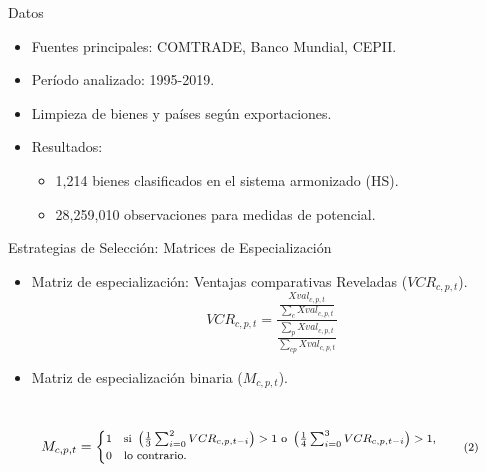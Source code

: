 \documentclass{beamer}
\begin{document}
\begin{frame}{Datos}
    \begin{itemize}
        \item Fuentes principales: COMTRADE, Banco Mundial, CEPII.
        \item Período analizado: 1995-2019.
        \item Limpieza de bienes y países según exportaciones.
        \item Resultados:
        \begin{itemize}
            \item 1,214 bienes clasificados en el sistema armonizado (HS).
            \item 28,259,010 observaciones para medidas de potencial.
        \end{itemize}
    \end{itemize}
\end{frame}


\begin{frame}{Estrategias de Selección: Matrices de Especialización}
    \begin{itemize}
        \item Matriz de especialización: Ventajas comparativas Reveladas ($VCR_{c,p,t}$).
        \begin{equation} 
      VCR_{c,p,t} = \frac{\frac{Xval_{c,p,t}}{\sum_{c}Xval_{c,p,t}}}{\frac{\sum_{p}Xval_{c,p,t}}{\sum_{cp}Xval_{c,p,t}}}
    \end{equation}
        \item Matriz de especialización binaria ($M_{c,p,t}$). 
    \end{itemize}
    \\
    \begin{equation}
    \fontsize{8}{10}\selectfont
    M_{c,p,t} =
    \begin{cases}
    1 & \text{si } \left( \frac{1}{3} \sum_{i=0}^{2} VCR_{c,p,t-i} \right) > 1 \ \text{o } \left( \frac{1}{4} \sum_{i=0}^{3} VCR_{c,p,t-i} \right) > 1, \\
    0 & \text{lo contrario}.
    \end{cases}
    \tag{2}\label{eq:mcpt}
    \end{equation}
    \vspace{-0.5cm}
\end{frame}
\end{document}
